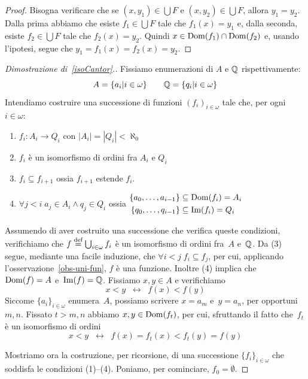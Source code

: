 \begin{proof}
	Bisogna verificare che se $(x,y_1) \in \bigcup F$ e $(x,y_2) \in \bigcup F$, allora $y_1 = y_2$.
Dalla prima abbiamo che esiste $f_1 \in \bigcup F$ tale che $f_1(x) = y_1$
e, dalla seconda, esiste $f_2 \in \bigcup F$ tale che $f_2(x) = y_2$.
Quindi $x\in \operatorname{Dom}(f_1) \cap \operatorname{Dom}(f_2)$ e, usando l'ipotesi, segue che $y_1 = f_1(x) = f_2(x) =
y_2$.
\end{proof}

\begin{proof}[Dimostrazione di~\ref{isoCantor}.]
	Fissiamo enumerazioni di $A$ e $\mathbb Q$ rispettivamente:
	\[ A = \{a_i | i \in \omega\} \qquad \mathbb Q = \{q_i | i \in \omega\}
		\]
	Intendiamo costruire una successione di funzioni $(f_i)_{i \in
\omega}$ tale che, per ogni $i \in \omega$:
	\begin{enumerate}[(1)]
		\item $f_i \colon A_i \to Q_i$ con $|A_i| = |Q_i| < \aleph_0$
		\item $f_i$ \`e un isomorfismo di ordini fra $A_i$ e $Q_i$
		\item $f_i \subseteq f_{i+1}$ {\drkgrn ossia $f_{i+1}$
estende $f_i$.}
		\item $\forall {j < i} \; a_j \in A_i \land q_j \in Q_i$
{\drkgrn ossia $\begin{aligned} \{a_0,\ldots,a_{i-1}\} &\subseteq
\operatorname{Dom}(f_i) = A_i \\
\{q_0,\ldots,q_{i-1}\} &\subseteq \operatorname{Im}(f_i) = Q_i
\end{aligned}$}
	\end{enumerate}

Assumendo di aver costruito una successione che verifica queste
condizioni, verifichiamo che $f \overset{\text{def}}{=} \bigcup_{i \in \omega} f_i$ \`e un
isomorfismo di ordini fra~$A$ e~$\mathbb Q$. Da (3) segue, mediante una facile
induzione, che $\forall {i < j} \; f_i \subseteq f_j$, per cui, applicando
l'osservazione~\ref{obs-uni-fun}, $f$ \`e una funzione. Inoltre (4)
implica che $\operatorname{Dom}(f)=A$ e~$\operatorname{Im}(f)=\mathbb Q$. Fissiamo $x,y\in A$ e
verifichiamo
\[x < y \;\;\leftrightarrow\;\; f(x) < f(y) \]
Siccome $\{a_i\}_{i\in\omega}$ enumera~$A$, possiamo scrivere $x=a_m$
e~$y=a_n$, per opportuni $m,n$. Fissato $t>m,n$ abbiamo $x,y\in\operatorname{Dom}(f_t)$,
per cui, sfruttando il fatto che~$f_t$ \`e un isomorfismo di ordini
		\[ x < y \;\;\leftrightarrow\;\; f(x) = f_t(x) < f_t(y) = f(y)
			\]

Mostriamo ora la costruzione, per ricorsione, di una successione
$\{f_i\}_{i \in \omega}$ che soddisfa le condizioni (1)--(4).
Poniamo, per cominciare, $f_0 = \emptyset$.


\end{proof}
